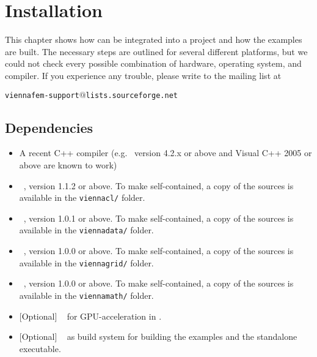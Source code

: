 \chapter{Installation}

This chapter shows how {\ViennaFEM} can be integrated into a project and how
the examples are built. The necessary steps are outlined for several different
platforms, but we could not check every possible combination of hardware,
operating system, and compiler. If you experience any trouble, please write to
the mailing list at \\
\begin{center}
\texttt{viennafem-support$@$lists.sourceforge.net} 
\end{center}


\section{Dependencies}
\label{dependencies}

\begin{itemize}
 \item A recent C++ compiler (e.g.~{\GCC} version 4.2.x or above and Visual C++
2005 or above are known to work)
 \item {\ViennaCL}~\cite{ViennaCL}, version 1.1.2 or above. To make {\ViennaFEM} self-contained, a copy of the {\ViennaCL} sources is available in the \lstinline|viennacl/| folder.
 \item {\ViennaData}~\cite{ViennaData}, version 1.0.1 or above. To make {\ViennaFEM} self-contained, a copy of the {\ViennaData} sources is available in the \lstinline|viennadata/| folder.
 \item {\ViennaGrid}~\cite{ViennaGrid}, version 1.0.0 or above. To make {\ViennaFEM} self-contained, a copy of the {\ViennaGrid} sources is available in the \lstinline|viennagrid/| folder.
 \item {\ViennaMath}~\cite{ViennaMath}, version 1.0.0 or above. To make {\ViennaFEM} self-contained, a copy of the {\ViennaMath} sources is available in the \lstinline|viennamath/| folder.
 \item {[}Optional{]} {\OpenCL}~\cite{khronoscl} for GPU-acceleration in {\ViennaCL}.
 \item {[}Optional{]} {\CMake}~\cite{cmake} as build system for building the examples and the standalone executable.
\end{itemize}


